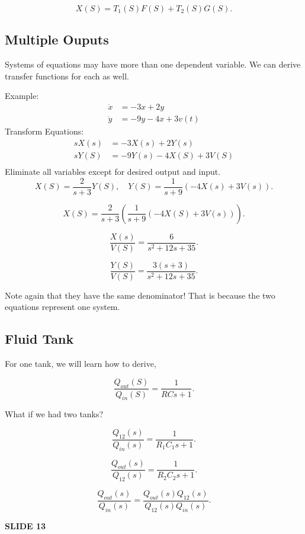 \documentclass[12pt, a4paper]{report}
\begin{document}
  \[
      X(S) = T_1(S)F(S) + T_2(S)G(S)
    .\]

  \subsection{Multiple Ouputs}

  Systems of equations may have more than one dependent variable. We can derive transfer functions for each as well.

  Example:
  \begin{align*}
    \dot x &= -3x + 2y \\
    \dot y &= -9y -4x + 3v(t)
  \end{align*}
  Transform Equations:
  \begin{align*}
    sX(s) &= -3X(s) +2Y(s) \\
    sY(S) &= -9Y(s) - 4X(S) + 3V(S) \\
  \end{align*}
  Eliminate all variables except for desired output and input.
  \[
      X(S) = \frac{2}{s+3}Y(S), \quad Y(S) = \frac{1}{s+9} \left( -4X(s) + 3V(s) \right)
    .\]

  \[
      X(S) = \frac{2}{s+3} \left( \frac{1}{s+9} (-4X(S) +3V(s)) \right)
    .\]

  \[
      \frac{X(s)}{V(S)} = \frac{6}{s ^2 + 12s + 35}
    .\]

  \[
      \frac{Y(S)}{V(S)} = \frac{3(s+3)}{s ^2 + 12s + 35}
    .\]

  Note again that they have the same denominator! That is because the two equations represent one system.

  \subsection{Fluid Tank}

  For one tank, we will learn how to derive,

  \[
      \frac{Q_{out}(S)}{Q_{in}(S)} = \frac{1}{RCs + 1}
    .\]

  What if we had two tanks?

  \[
      \frac{Q_{12}(s)}{Q_{in}(s)} = \frac{1}{R_1C_1s + 1}
    .\]

    \[
        \frac{Q_{out}(s)}{Q_{12}(s)} = \frac{1}{R_2C_2s + 1}
      .\]

  \[
      \frac{Q_{out}(s)}{Q_{in}(s)} = \frac{Q_{out}(s)Q_{12}(s)}{Q_{12}(s)Q_{in}(s)}
    .\]

    \textbf{SLIDE 13}
\end{document}
